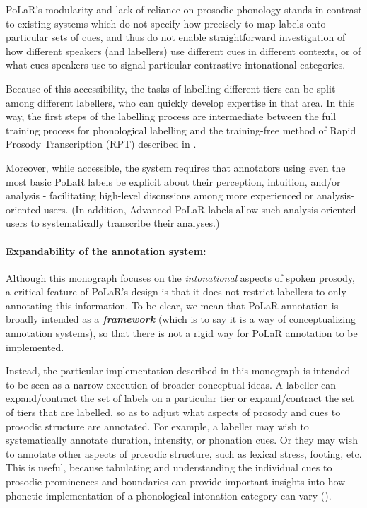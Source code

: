 PoLaR’s modularity and lack of reliance on prosodic phonology stands in contrast to existing systems which do not specify how precisely to map labels onto particular sets of cues, and thus do not enable straightforward investigation of how different speakers (and labellers) use different cues in different contexts, or of what cues speakers use to signal particular contrastive intonational categories.

Because of this accessibility, the tasks of labelling different tiers can be split among different labellers, who can quickly develop expertise in that area.  In this way, the first steps of the labelling process are intermediate between the full training process for phonological labelling and the training-free method of Rapid Prosody Transcription (RPT) described in \citet{cole-14, cole-17}. 

Moreover, while accessible, the system requires that annotators using even the most basic PoLaR labels be explicit about their perception, intuition, and/or analysis - facilitating high-level discussions among more experienced or analysis-oriented users. (In addition, Advanced PoLaR labels allow such analysis-oriented users to systematically transcribe their analyses.)

\paragraph{Expandability of the annotation system:}
Although this monograph focuses on the \emph{intonational} aspects of spoken prosody, a critical feature of PoLaR’s design is that it does not restrict labellers to only annotating this information. To be clear, we mean that PoLaR annotation is broadly intended as a \emph{\textbf{framework}} (which is to say it is a way of conceptualizing annotation systems), so that there is not a rigid way for PoLaR annotation to be implemented. 

Instead, the particular implementation described in this monograph is intended to be seen as a narrow execution of broader conceptual ideas. A labeller can expand\slash contract the set of labels on a particular tier or expand\slash contract the set of tiers that are labelled, so as to adjust what aspects of prosody and cues to prosodic structure are annotated. For example, a labeller may wish to systematically annotate duration, intensity, or phonation cues. Or they may wish to annotate other aspects of prosodic structure, such as lexical stress, footing, etc. This is useful, because tabulating and understanding the individual cues to prosodic prominences and boundaries can provide important insights into how phonetic implementation of a phonological intonation category can vary (\citealt{brugos15, brugos-18}).

